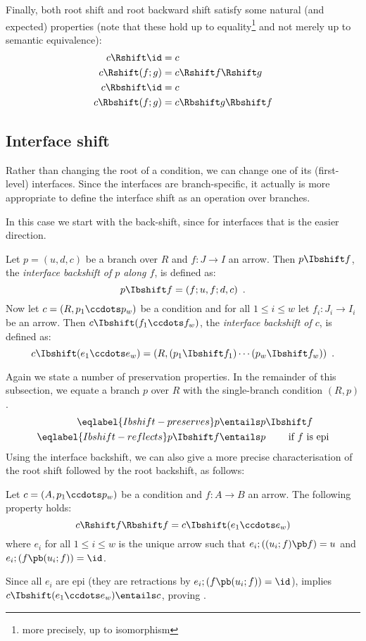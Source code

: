 Finally, both root shift and root backward shift satisfy some natural (and expected) properties (note that these hold up to equality\footnote{more precisely, up to isomorphism} and not merely up to semantic equivalence):
%
\begin{align}
c\Rshift \id & = c \\
c\Rshift (f;g) & = c\Rshift f\Rshift g \\
c\Rbshift \id & = c \\
c\Rbshift (f;g) & = c\Rbshift g\Rbshift f
\end{align}

\subsection{Interface shift}

Rather than changing the root of a condition, we can change one of its (first-level) interfaces. Since the interfaces are branch-specific, it actually is more appropriate to define the interface shift as an operation over branches.

In this case we start with the back-shift, since for interfaces that is the easier direction.

\begin{definition}
    Let $p=(u,d,c)$ be a branch over $R$ and $f: J \to I$ an arrow. Then $p\Ibshift f$, the \emph{interface backshift of $p$ along $f$}, is defined as:
     \[ p \Ibshift f = (f;u,f;d,c) \enspace. \]
    Now let $c=(R,p_1\ccdots p_w)$ be a condition and for all $1\leq i\leq w$ let $f_i:J_i\to I_i$ be an arrow. Then $c\Ibshift (f_1\ccdots f_w)$, the \emph{interface backshift of $c$}, is defined as:
	\[ c \Ibshift (e_1\ccdots e_w) = (R,(p_1\Ibshift f_1)\cdots (p_w\Ibshift f_w)) \enspace. \]
\end{definition}
%
Again we state a number of preservation properties. In the remainder of this subsection, we equate a branch $p$ over $R$ with the single-branch condition $(R,p)$.
%
\begin{align}
\eqlabel{Ibshift-preserves}
p & \entails p\Ibshift f \\
\eqlabel{Ibshift-reflects}
p\Ibshift f & \entails p \qquad\text{ if $f$ is epi}
\end{align}
%
Using the interface backshift, we can also give a more precise characterisation of the root shift followed by the root backshift, as follows:
%
\begin{lemma}
Let $c=(A,p_1\ccdots p_w)$ be a condition and $f:A\to B$ an arrow. The following property holds:
\[ c\Rshift f\Rbshift f=c\Ibshift (e_1\ccdots e_w) \]
where $e_i$ for all $1\leq i\leq w$ is the unique arrow such that $e_i;((u_i;f)\pb f)=u$ and $e_i;(f\pb (u_i;f))=\id$.
\end{lemma}
%
Since all $e_i$ are epi (they are retractions by $e_i;(f\pb (u_i;f))=\id$),  implies $c\Ibshift  (e_1\ccdots e_w)\entails c$, proving .


